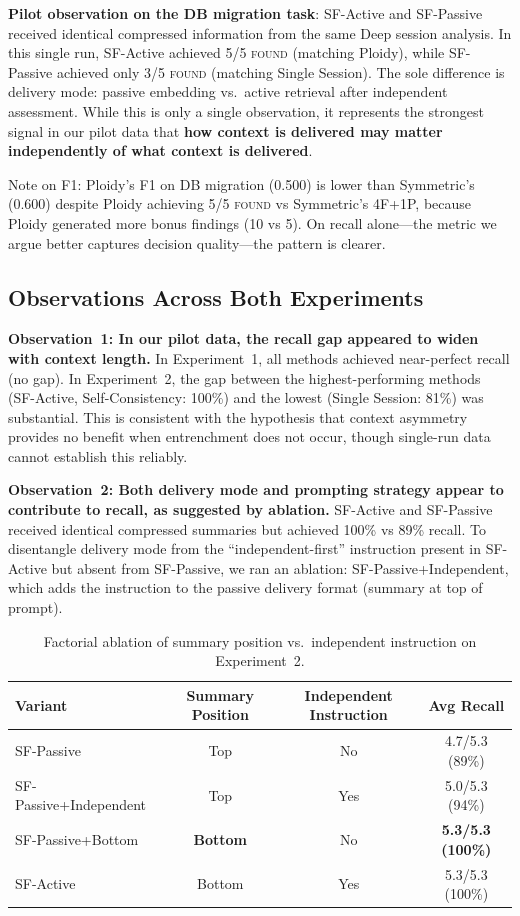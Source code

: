 \documentclass[11pt]{article}
\begin{document}
\textbf{Pilot observation on the DB migration task}: SF-Active and SF-Passive received identical compressed information from the same Deep session analysis. In this single run, SF-Active achieved 5/5 \textsc{found} (matching Ploidy), while SF-Passive achieved only 3/5 \textsc{found} (matching Single Session). The sole difference is delivery mode: passive embedding vs.\ active retrieval after independent assessment. While this is only a single observation, it represents the strongest signal in our pilot data that \textbf{how context is delivered may matter independently of what context is delivered}.

Note on F1: Ploidy's F1 on DB migration (0.500) is lower than Symmetric's (0.600) despite Ploidy achieving 5/5 \textsc{found} vs Symmetric's 4F+1P, because Ploidy generated more bonus findings (10 vs 5). On recall alone---the metric we argue better captures decision quality---the pattern is clearer.

\subsection{Observations Across Both Experiments}
\label{sec:cross-observations}

\textbf{Observation~1: In our pilot data, the recall gap appeared to widen with context length.} In Experiment~1, all methods achieved near-perfect recall (no gap). In Experiment~2, the gap between the highest-performing methods (SF-Active, Self-Consistency: 100\%) and the lowest (Single Session: 81\%) was substantial. This is consistent with the hypothesis that context asymmetry provides no benefit when entrenchment does not occur, though single-run data cannot establish this reliably.

\textbf{Observation~2: Both delivery mode and prompting strategy appear to contribute to recall, as suggested by ablation.} SF-Active and SF-Passive received identical compressed summaries but achieved 100\% vs 89\% recall. To disentangle delivery mode from the ``independent-first'' instruction present in SF-Active but absent from SF-Passive, we ran an ablation: SF-Passive+Independent, which adds the instruction to the passive delivery format (summary at top of prompt).

\begin{table}[H]
\centering
\caption{Factorial ablation of summary position vs.\ independent instruction on Experiment~2.}
\label{tab:ablation}
\small
\begin{tabular}{@{}lccc@{}}
\toprule
\textbf{Variant} & \textbf{Summary Position} & \textbf{Independent Instruction} & \textbf{Avg Recall} \\
\midrule
SF-Passive              & Top    & No           & 4.7/5.3 (89\%) \\
SF-Passive+Independent  & Top    & Yes          & 5.0/5.3 (94\%) \\
SF-Passive+Bottom       & \textbf{Bottom} & No  & \textbf{5.3/5.3 (100\%)} \\
SF-Active               & Bottom & Yes          & 5.3/5.3 (100\%) \\
\bottomrule
\end{tabular}
\end{table}
\end{document}
